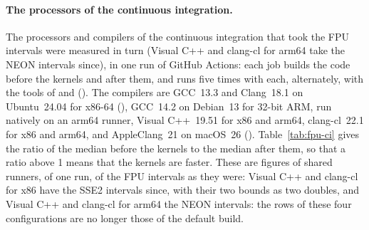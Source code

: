 \paragraph{The processors of the continuous integration.} The processors and
compilers of the continuous integration that took the FPU intervals were
measured in turn (Visual C++ and clang-cl for arm64 take the NEON intervals
since),\newinvfive{} in one run of GitHub Actions:
each job builds the code before the kernels and after them, and runs
 five times with each, alternately, with the tools of
 and 
(). The compilers are GCC~13.3 and Clang~18.1 on
Ubuntu~24.04 for x86-64 (), GCC~14.2 on Debian~13
for 32-bit ARM, run natively on an arm64 runner, Visual C++~19.51 for x86 and
arm64, clang-cl~22.1 for x86 and arm64, and AppleClang~21 on macOS~26
(). Table~\ref{tab:fpu-ci} gives the ratio of the
median before the kernels to the median after them, so that a ratio above 1
means that the kernels are faster. These are figures of shared runners, of
one run, of the FPU intervals as they were: Visual C++ and clang-cl for x86
have the SSE2 intervals since,\newinvfive{} with their two bounds as two
doubles, and Visual C++ and clang-cl for arm64 the NEON intervals: the rows of
these four configurations are no longer those of the default build.

